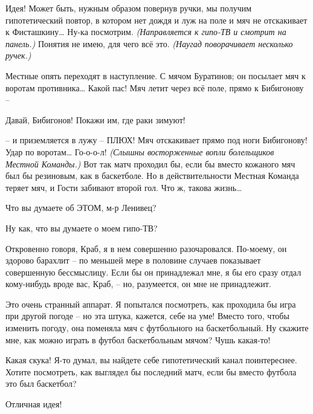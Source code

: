 \documentclass[../main.tex]{subfiles}
\begin{document}
\begin{dialogue}
 Идея! Может быть, нужным образом повернув ручки, мы получим гипотетический повтор, в котором нет дождя и луж на поле и мяч не отскакивает к Фисташкину\ldots{} Ну-ка посмотрим. \emph{(Направляется к гипо-ТВ и смотрит на панель.)} Понятия не имею, для чего всё это. \emph{(Наугад поворачивает несколько ручек.)}

 Местные опять переходят в наступление. С мячом Буратинов; он посылает мяч к воротам противника\ldots{} Какой пас! Мяч летит через всё поле, прямо к Бибигонову \---

 Давай, Бибигонов! Покажи им, где раки зимуют!

 \--- и приземляется в лужу \--- ПЛЮХ! Мяч отскакивает прямо под ноги Бибигонову! Удар по воротам\ldots{} Го-о-о-л! \emph{(Слышны восторженные вопли болельщиков Местной Команды.)} Вот так матч проходил бы, если бы вместо кожаного мяч был бы резиновым, как в баскетболе. Но в действительности Местная Команда теряет мяч, и Гости забивают второй гол. Что ж, такова жизнь\ldots{}

 Что вы думаете об ЭТОМ, м-р Ленивец?


 Ну как, что вы думаете о моем гипо-ТВ?

 Откровенно говоря, Краб, я в нем совершенно разочаровался. По-моему, он здорово барахлит \--- по меньшей мере в половине случаев показывает совершенную бессмыслицу. Если бы он принадлежал мне, я бы его сразу отдал кому-нибудь вроде вас, Краб, \--- но, разумеется, он мне не принадлежит.

 Это очень странный аппарат. Я попытался посмотреть, как проходила бы игра при другой погоде \--- но эта штука, кажется, себе на уме! Вместо того, чтобы изменить погоду, она поменяла мяч с футбольного на баскетбольный. Ну скажите мне, как можно играть в футбол баскетбольным мячом? Чушь какая-то!

 Какая скука! Я-то думал, вы найдете себе гипотетический канал поинтереснее. Хотите посмотреть, как выглядел бы последний матч, если бы вместо футбола это был баскетбол?

 Отличная идея!


\end{dialogue}
\end{document}
